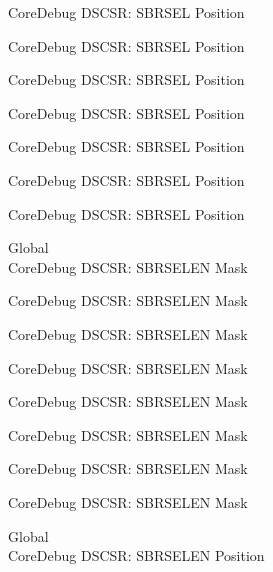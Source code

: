 \begin{DoxyRefList}
\label{deprecated__deprecated000149}%
%
Core\+Debug DSCSR\+: SBRSEL Position 

\label{deprecated__deprecated000225}%
%
Core\+Debug DSCSR\+: SBRSEL Position 

\label{deprecated__deprecated000288}%
%
Core\+Debug DSCSR\+: SBRSEL Position 

\label{deprecated__deprecated000367}%
%
Core\+Debug DSCSR\+: SBRSEL Position 

\label{deprecated__deprecated000443}%
%
Core\+Debug DSCSR\+: SBRSEL Position 

\label{deprecated__deprecated000546}%
%
Core\+Debug DSCSR\+: SBRSEL Position 

\label{deprecated__deprecated000648}%
%
Core\+Debug DSCSR\+: SBRSEL Position  
\item[Global \doxylink{group___c_m_s_i_s___s_c_b_ga5e5ed94cac1139165af161c008881805}{Core\+Debug\+\_\+\+DSCSR\+\_\+\+SBRSELEN\+\_\+\+Msk} ]\hfill \\
\label{deprecated__deprecated000098}%
%
Core\+Debug DSCSR\+: SBRSELEN Mask 

\label{deprecated__deprecated000152}%
%
Core\+Debug DSCSR\+: SBRSELEN Mask 

\label{deprecated__deprecated000228}%
%
Core\+Debug DSCSR\+: SBRSELEN Mask 

\label{deprecated__deprecated000291}%
%
Core\+Debug DSCSR\+: SBRSELEN Mask 

\label{deprecated__deprecated000370}%
%
Core\+Debug DSCSR\+: SBRSELEN Mask 

\label{deprecated__deprecated000446}%
%
Core\+Debug DSCSR\+: SBRSELEN Mask 

\label{deprecated__deprecated000549}%
%
Core\+Debug DSCSR\+: SBRSELEN Mask 

\label{deprecated__deprecated000651}%
%
Core\+Debug DSCSR\+: SBRSELEN Mask  
\item[Global \doxylink{group___c_m_s_i_s___s_c_b_ga3eb88e444b678057db1b59272eebb1ad}{Core\+Debug\+\_\+\+DSCSR\+\_\+\+SBRSELEN\+\_\+\+Pos} ]\hfill \\
\label{deprecated__deprecated000097}%
%
Core\+Debug DSCSR\+: SBRSELEN Position 


\end{DoxyRefList}
